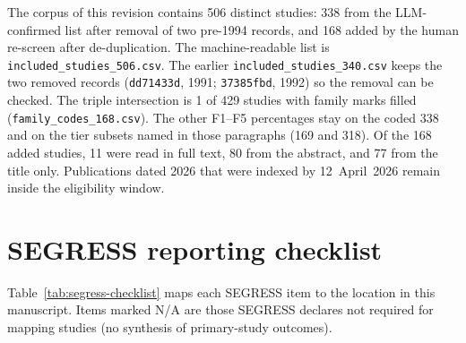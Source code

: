 The corpus of this revision contains 506 distinct studies: 338 from the
LLM-confirmed list after removal of two pre-1994 records, and 168 added by
the human re-screen after de-duplication. The machine-readable list is
\texttt{included\_studies\_506.csv}. The earlier
\texttt{included\_studies\_340.csv} keeps the two removed records
(\texttt{dd71433d}, 1991; \texttt{37385fbd}, 1992) so the removal can be
checked. The triple intersection is 1 of 429 studies with family marks
filled (\texttt{family\_codes\_168.csv}). The other F1--F5 percentages stay
on the coded 338 and on the tier subsets named in those paragraphs (169 and
318). Of the 168 added studies, 11 were read in full text, 80 from the
abstract, and 77 from the title only. Publications dated 2026 that were
indexed by 12~April~2026 remain inside the eligibility window.

\section{SEGRESS reporting checklist}
\label{app:segress}

Table~\ref{tab:segress-checklist} maps each SEGRESS item to the location in
this manuscript. Items marked N/A are those SEGRESS declares not required
for mapping studies (no synthesis of primary-study outcomes).


